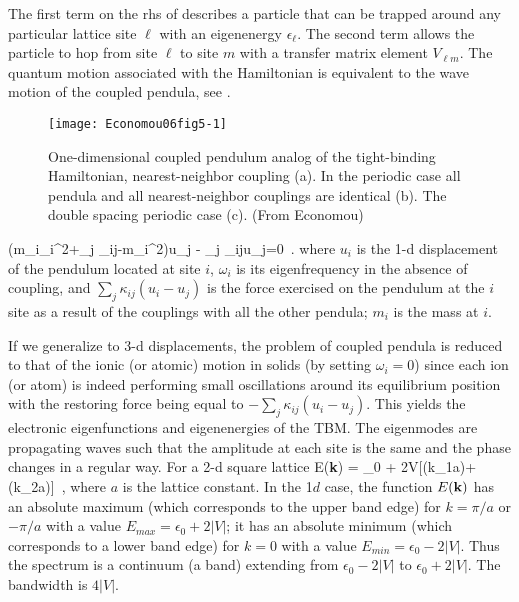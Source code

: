 The first term on the rhs of  describes a particle
that can be trapped around any particular lattice site $\ell$ with an
eigenenergy $\epsilon_\ell$. The second term allows the particle to hop
from site $\ell$ to site $m$ with a transfer matrix element
$V_{\ell{m}}$. The quantum motion associated with the Hamiltonian
 is equivalent to the wave motion of the coupled
pendula, see .
%
\begin{figure}
  \centering
  \texttt{[image: Economou06fig5-1]}
  \caption{
One-dimensional coupled pendulum analog of the tight-binding Hamiltonian,
nearest-neighbor coupling (a). In the periodic case
all pendula and all nearest-neighbor couplings
are identical (b). The double spacing periodic case (c).
(From Economou)
  }
  \label{Economou06fig5-1}
\end{figure}
%
\beq
\left(m_i\omega_i^2+\sum_j \kappa_{ij}-m_i\omega^2\right)u_j
- \sum_j \kappa_{ij}u_j=0
\,.
where $u_i$ is the 1-d displacement of the pendulum located at site $i$,
$\omega_i$ is its eigenfrequency in the absence of coupling, and
$\sum_j\kappa_{ij}(u_i-u_j)$ is the force exercised on the pendulum at
the $i$ site as a result of the couplings with all the other pendula;
$m_i$ is the mass at $i$.

If we generalize to 3-d displacements, the problem of coupled pendula is
reduced to that of the ionic (or atomic) motion in solids (by setting
$\omega_i = 0$) since each ion (or atom) is indeed performing small
oscillations around its equilibrium position with the restoring force
being equal to $-\sum_j\kappa_{ij}(u_i-u_j)$. This yields the electronic
eigenfunctions and eigenenergies of the TBM. The eigenmodes are
propagating waves such that the amplitude at each site is the same and
the phase changes in a regular way. For a 2-d square lattice
\beq
E({\bf k}) = \epsilon_0 + 2V[\cos(k_1a)+\cos(k_2a)]
\,,
where $a$ is the lattice constant. In the 1$d$ case, the function
$E({\bf k})$ has an absolute maximum (which corresponds to the upper band
edge) for $k=\pi/a$ or $-\pi/a$ with a value $E_{max}=\epsilon_0+2|V|$;
it has an absolute minimum (which corresponds to a lower band edge) for
$k=0$ with a value $E_{min}=\epsilon_0-2|V|$. Thus the spectrum is a
continuum (a band) extending from $\epsilon_0-2|V|$ to $\epsilon_0+2|V|$.
The bandwidth is $4|V|$.







